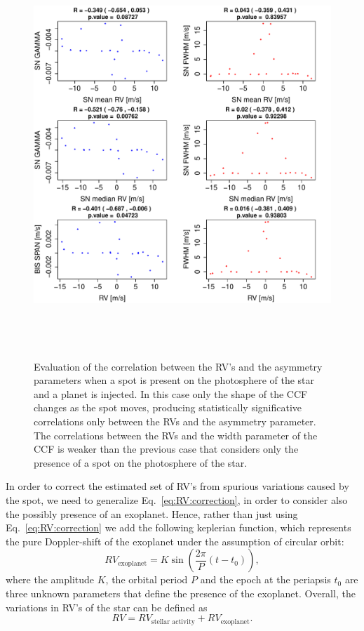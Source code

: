 \documentclass[11pt, oneside]{article}
\begin{document}
\begin{figure}[htbp]
   \centering
\includegraphics[height = 6in]{SOAP_SPOT_PLANET_Comparison_para_SN.pdf} 
   \caption{Evaluation of the correlation between the RV's and the asymmetry parameters when a spot is present on the photosphere of the star and a planet is injected.  In this case only the shape of the CCF changes as the spot moves, producing statistically significative correlations only between the RVs and the asymmetry parameter. The correlations between the RVs and the width parameter of the CCF is weaker than the previous case that considers only the presence of a spot on the photosphere of the star.}
    \label{fig:spot.plus.planet.corr}
\end{figure}

In order to correct the estimated set of RV's from spurious variations caused by the spot, we need to generalize Eq.~\ref{eq:RV:correction}, in order to consider also the possibly presence of an exoplanet. Hence, rather than just using Eq.~\ref{eq:RV:correction} we add the following keplerian function, which represents the pure Doppler-shift of the exoplanet under the assumption of circular orbit:
%
\begin{equation}
RV_{\text{exoplanet}}= K \sin \left(\frac{2 \pi}{P} (t - t_{0})\right),
\label{eq:RV:correction.planet}
\end{equation}
%
where the amplitude $K$, the orbital period $P$ and the epoch at the periapsis $t_{0}$ are three unknown parameters that define the presence of the exoplanet. Overall, the variations in RV's of the star can be defined as
%
\begin{equation}
RV= RV_{\text{stellar activity}} + RV_{\text{exoplanet}}.
\label{eq:RV:correction.overall}
\end{equation}
%
\end{document}

